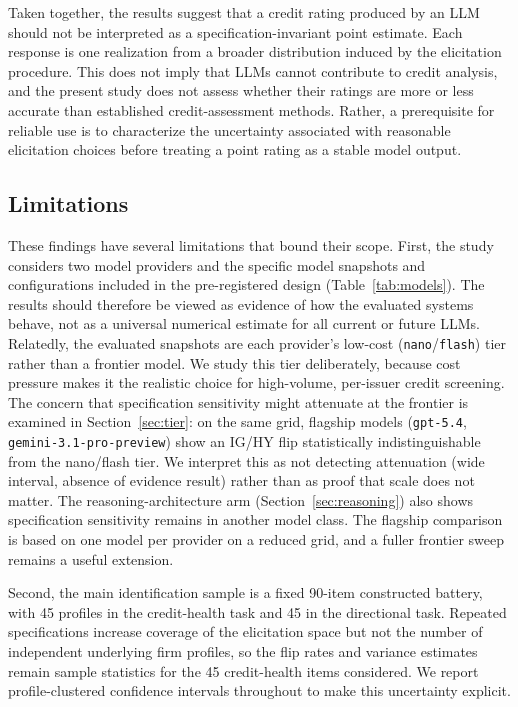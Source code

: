 \documentclass[a4paper,fleqn]{cas-sc}
\begin{document}
Taken together, the results suggest that a credit rating produced by an LLM should not be interpreted as a
specification-invariant point estimate. Each response is one realization from a broader distribution
induced by the elicitation procedure. This does not imply that LLMs cannot contribute to credit analysis,
and the present study does not assess whether their ratings are more or less accurate than established
credit-assessment methods. Rather, a prerequisite for reliable use is to characterize the uncertainty
associated with reasonable elicitation choices before treating a point rating as a stable model output.

\subsection{Limitations}\label{sec:limitations}
These findings have several limitations that bound their scope. First, the study considers two model
providers and the specific model snapshots and configurations included in the pre-registered design
(Table~\ref{tab:models}). The results should therefore be viewed as evidence of how the evaluated systems
behave, not as a universal numerical estimate for all current or future LLMs. Relatedly, the evaluated
snapshots are each provider's low-cost (\texttt{nano}/\texttt{flash}) tier rather than a frontier model.
We study this tier deliberately, because cost pressure makes it the realistic choice for high-volume,
per-issuer credit screening. The concern that specification sensitivity might attenuate at the frontier
is examined in Section~\ref{sec:tier}: on the same grid, flagship models
(\texttt{gpt-5.4}, \texttt{gemini-3.1-pro-preview}) show an IG/HY flip statistically indistinguishable
from the nano/flash tier. We interpret this as not detecting attenuation (wide interval, absence of evidence
result) rather than as proof that scale does not matter. The reasoning-architecture arm
(Section~\ref{sec:reasoning}) also shows specification sensitivity remains in another model
class. The flagship comparison is based on one model per provider on a reduced grid, and a fuller frontier
sweep remains a useful extension.

Second, the main identification sample is a fixed 90-item constructed battery, with 45 profiles in the
credit-health task and 45 in the directional task. Repeated specifications increase coverage of the
elicitation space but not the number of independent underlying firm profiles, so the flip rates and
variance estimates remain sample statistics for the 45 credit-health items considered. We report
profile-clustered confidence intervals throughout to make this uncertainty explicit.
\end{document}

